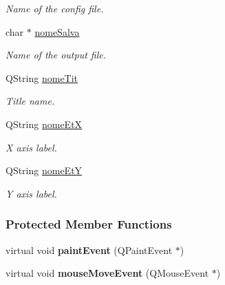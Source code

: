 \begin{DoxyCompactItemize}
\begin{DoxyCompactList}\small\item\em \-Name of the config file. \end{DoxyCompactList}\item 
\hypertarget{classElementiGrafici_a516c32509a9d2ba2c9f7e53fcdbd9ce0}{char $\ast$ \hyperlink{classElementiGrafici_a516c32509a9d2ba2c9f7e53fcdbd9ce0}{nome\-Salva}}\label{classElementiGrafici_a516c32509a9d2ba2c9f7e53fcdbd9ce0}

\begin{DoxyCompactList}\small\item\em \-Name of the output file. \end{DoxyCompactList}\item 
\hypertarget{classElementiGrafici_a99be08b66bcb34c0eaed5636e717154e}{\-Q\-String \hyperlink{classElementiGrafici_a99be08b66bcb34c0eaed5636e717154e}{nome\-Tit}}\label{classElementiGrafici_a99be08b66bcb34c0eaed5636e717154e}

\begin{DoxyCompactList}\small\item\em \-Title name. \end{DoxyCompactList}\item 
\hypertarget{classElementiGrafici_a2237fc9b6764dc053b817d31bc133b3e}{\-Q\-String \hyperlink{classElementiGrafici_a2237fc9b6764dc053b817d31bc133b3e}{nome\-Et\-X}}\label{classElementiGrafici_a2237fc9b6764dc053b817d31bc133b3e}

\begin{DoxyCompactList}\small\item\em \-X axis label. \end{DoxyCompactList}\item 
\hypertarget{classElementiGrafici_a42f259c584d0d2e7aeb9967d149bd15e}{\-Q\-String \hyperlink{classElementiGrafici_a42f259c584d0d2e7aeb9967d149bd15e}{nome\-Et\-Y}}\label{classElementiGrafici_a42f259c584d0d2e7aeb9967d149bd15e}

\begin{DoxyCompactList}\small\item\em \-Y axis label. \end{DoxyCompactList}\end{DoxyCompactItemize}
\subsubsection*{\-Protected \-Member \-Functions}
\begin{DoxyCompactItemize}
\item 
\hypertarget{classElementiGrafici_ad06d035e601c42cc2a3b9d1229c73d36}{virtual void {\bfseries paint\-Event} (\-Q\-Paint\-Event $\ast$)}\label{classElementiGrafici_ad06d035e601c42cc2a3b9d1229c73d36}

\item 
\hypertarget{classElementiGrafici_a88e672693c2cfdbaf9af942a58a8e1dd}{virtual void {\bfseries mouse\-Move\-Event} (\-Q\-Mouse\-Event $\ast$)}\label{classElementiGrafici_a88e672693c2cfdbaf9af942a58a8e1dd}

\end{DoxyCompactItemize}


